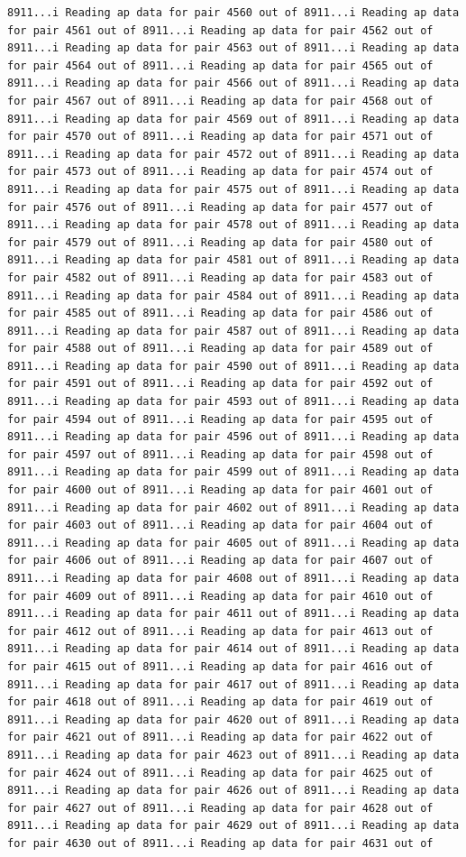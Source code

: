 \documentclass[
]{article}
\begin{document}
\begin{verbatim}
8911...i Reading ap data for pair 4560 out of 8911...i Reading ap data for pair 4561 out of 8911...i Reading ap data for pair 4562 out of 8911...i Reading ap data for pair 4563 out of 8911...i Reading ap data for pair 4564 out of 8911...i Reading ap data for pair 4565 out of 8911...i Reading ap data for pair 4566 out of 8911...i Reading ap data for pair 4567 out of 8911...i Reading ap data for pair 4568 out of 8911...i Reading ap data for pair 4569 out of 8911...i Reading ap data for pair 4570 out of 8911...i Reading ap data for pair 4571 out of 8911...i Reading ap data for pair 4572 out of 8911...i Reading ap data for pair 4573 out of 8911...i Reading ap data for pair 4574 out of 8911...i Reading ap data for pair 4575 out of 8911...i Reading ap data for pair 4576 out of 8911...i Reading ap data for pair 4577 out of 8911...i Reading ap data for pair 4578 out of 8911...i Reading ap data for pair 4579 out of 8911...i Reading ap data for pair 4580 out of 8911...i Reading ap data for pair 4581 out of 8911...i Reading ap data for pair 4582 out of 8911...i Reading ap data for pair 4583 out of 8911...i Reading ap data for pair 4584 out of 8911...i Reading ap data for pair 4585 out of 8911...i Reading ap data for pair 4586 out of 8911...i Reading ap data for pair 4587 out of 8911...i Reading ap data for pair 4588 out of 8911...i Reading ap data for pair 4589 out of 8911...i Reading ap data for pair 4590 out of 8911...i Reading ap data for pair 4591 out of 8911...i Reading ap data for pair 4592 out of 8911...i Reading ap data for pair 4593 out of 8911...i Reading ap data for pair 4594 out of 8911...i Reading ap data for pair 4595 out of 8911...i Reading ap data for pair 4596 out of 8911...i Reading ap data for pair 4597 out of 8911...i Reading ap data for pair 4598 out of 8911...i Reading ap data for pair 4599 out of 8911...i Reading ap data for pair 4600 out of 8911...i Reading ap data for pair 4601 out of 8911...i Reading ap data for pair 4602 out of 8911...i Reading ap data for pair 4603 out of 8911...i Reading ap data for pair 4604 out of 8911...i Reading ap data for pair 4605 out of 8911...i Reading ap data for pair 4606 out of 8911...i Reading ap data for pair 4607 out of 8911...i Reading ap data for pair 4608 out of 8911...i Reading ap data for pair 4609 out of 8911...i Reading ap data for pair 4610 out of 8911...i Reading ap data for pair 4611 out of 8911...i Reading ap data for pair 4612 out of 8911...i Reading ap data for pair 4613 out of 8911...i Reading ap data for pair 4614 out of 8911...i Reading ap data for pair 4615 out of 8911...i Reading ap data for pair 4616 out of 8911...i Reading ap data for pair 4617 out of 8911...i Reading ap data for pair 4618 out of 8911...i Reading ap data for pair 4619 out of 8911...i Reading ap data for pair 4620 out of 8911...i Reading ap data for pair 4621 out of 8911...i Reading ap data for pair 4622 out of 8911...i Reading ap data for pair 4623 out of 8911...i Reading ap data for pair 4624 out of 8911...i Reading ap data for pair 4625 out of 8911...i Reading ap data for pair 4626 out of 8911...i Reading ap data for pair 4627 out of 8911...i Reading ap data for pair 4628 out of 8911...i Reading ap data for pair 4629 out of 8911...i Reading ap data for pair 4630 out of 8911...i Reading ap data for pair 4631 out of 
\end{verbatim}
\end{document}
